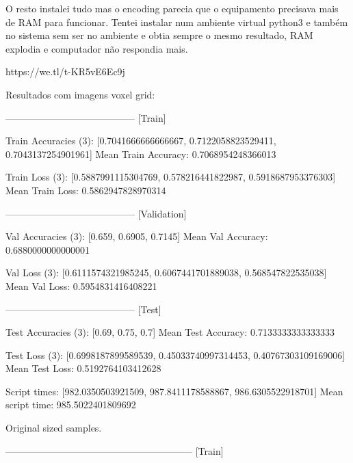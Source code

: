     O resto instalei tudo mas o encoding parecia que o equipamento precisava mais de RAM para funcionar. Tentei instalar num ambiente virtual python3 e também no sistema sem ser no ambiente e obtia sempre o mesmo resultado, RAM explodia e computador não respondia mais.
    
https://we.tl/t-KR5vE6Ec9j



Resultados com imagens voxel grid:

    -----------------------------------------
    [Train]
    
    Train Accuracies (3): 
    [0.7041666666666667, 0.7122058823529411, 0.7043137254901961]
    Mean Train Accuracy: 0.7068954248366013
    
    Train Loss (3): 
    [0.5887991115304769, 0.578216441822987, 0.5918687953376303]
    Mean Train Loss: 0.5862947828970314
    
    
    -----------------------------------------
    [Validation]
    
    Val Accuracies (3): 
    [0.659, 0.6905, 0.7145]
    Mean Val Accuracy: 0.6880000000000001
    
    Val Loss (3): 
    [0.6111574321985245, 0.6067441701889038, 0.568547822535038]
    Mean Val Loss: 0.5954831416408221
    
    
    -----------------------------------------
    [Test]
    
    Test Accuracies (3): 
    [0.69, 0.75, 0.7]
    Mean Test Accuracy: 0.7133333333333333
    
    Test Loss (3): 
    [0.6998187899589539, 0.45033740997314453, 0.40767303109169006]
    Mean Test Loss: 0.5192764103412628
    
    
    
    Script times: [982.0350503921509, 987.8411178588867, 986.6305522918701]
    Mean script time: 985.5022401809692
    
    
    
    
    
    
    
    
    
    
    
    
    
    
    
    
    
    
    
    
    
    Original sized samples.
    
-----------------------------------------------------------
[Train]

